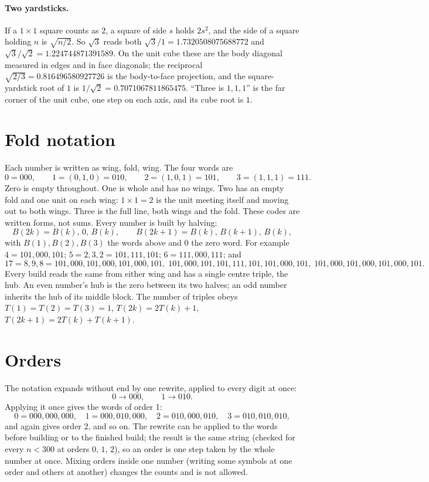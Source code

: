 \documentclass[11pt]{article}
\begin{document}
\paragraph{Two yardsticks.} If a $1\times1$ square counts as $2$, a square of side $s$ holds $2s^2$, and the side of a square holding $n$ is $\sqrt{n/2}$. So $\sqrt3$ reads both $\sqrt3/1 = 1.7320508075688772$ and $\sqrt3/\sqrt2 = 1.224744871391589$. On the unit cube these are the body diagonal measured in edges and in face diagonals; the reciprocal $\sqrt{2/3} = 0.816496580927726$ is the body-to-face projection, and the square-yardstick root of $1$ is $1/\sqrt2 = 0.7071067811865475$. ``Three is $1,1,1$'' is the far corner of the unit cube, one step on each axis, and its cube root is $1$.

\section{Fold notation}
Each number is written as wing, fold, wing. The four words are
\[ 0 = 000,\qquad 1 = (0,1,0) = 010,\qquad 2 = (1,0,1) = 101,\qquad 3 = (1,1,1) = 111. \]
Zero is empty throughout. One is whole and has no wings. Two has an empty fold and one unit on each wing: $1\times1 = 2$ is the unit meeting itself and moving out to both wings. Three is the full line, both wings and the fold. These codes are written forms, not sums. Every number is built by halving:
\[ B(2k)=B(k),\,0,\,B(k),\qquad B(2k{+}1)=B(k),\,B(k{+}1),\,B(k), \]
with $B(1), B(2), B(3)$ the words above and $0$ the zero word. For example $4 = 101,000,101$; $5 = 2,3,2 = 101,111,101$; $6 = 111,000,111$; and
\[ \scriptstyle 17 = 8,9,8 = 101,000,101,000,101,000,101,\;101,000,101,101,111,101,101,000,101,\;101,000,101,000,101,000,101. \]
Every build reads the same from either wing and has a single centre triple, the hub. An even number's hub is the zero between its two halves; an odd number inherits the hub of its middle block. The number of triples obeys $T(1)=T(2)=T(3)=1$, $T(2k)=2T(k)+1$, $T(2k+1)=2T(k)+T(k+1)$.

\section{Orders}
The notation expands without end by one rewrite, applied to every digit at once:
\[ 0 \to 000,\qquad 1 \to 010. \]
Applying it once gives the words of order 1:
\[ 0 = 000,000,000,\quad 1 = 000,010,000,\quad 2 = 010,000,010,\quad 3 = 010,010,010, \]
and again gives order 2, and so on. The rewrite can be applied to the words before building or to the finished build; the result is the same string (checked for every $n<300$ at orders $0$, $1$, $2$), so an order is one step taken by the whole number at once. Mixing orders inside one number (writing some symbols at one order and others at another) changes the counts and is not allowed.
\end{document}
